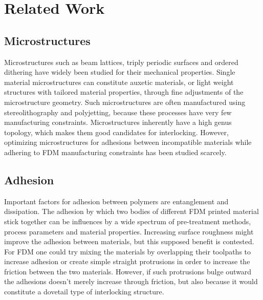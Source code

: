\section{Related Work}


\subsection{Microstructures}
Microstructures such as beam lattices, triply periodic surfaces and ordered dithering have widely been studied for their mechanical properties\cite{Cadman2013,Zhang2018a,tamburrino2018}.
Single material microstructures can constitute auxetic materials, or light weight structures with tailored material properties, through fine adjustments of the microstructure geometry.
Such microstructures are often manufactured using stereolithography and polyjetting, because these processes have very few manufacturing constraints.
Microstructures inherently have a high genus topology, which makes them good candidates for interlocking\cite{freund2019determination}.
However, optimizing microstructures for adhesions between incompatible materials while adhering to FDM manufacturing constraints has been studied scarcely.



\subsection{Adhesion}

Important factors for adhesion between polymers are entanglement and dissipation\cite{abbott2015adhesion}.
The adhesion by which two bodies of different FDM printed material stick together can be influences by a wide spectrum of pre-treatment methods, process parameters and material properties\cite{freund2019determination}.
Increasing surface roughness might improve the adhesion between materials\cite{huttenbach1991interface,gent1990model}, but this supposed benefit is contested\cite{abbott2015adhesion}.
For FDM one could try mixing the materials by overlapping their toolpaths to increase adhesion or create simple straight protrusions in order to increase the friction between the two materials\cite{tamburrino19}.
However, if such protrusions bulge outward the adhesions doesn't merely increase through friction, but also because it would constitute a dovetail type of interlocking structure.



